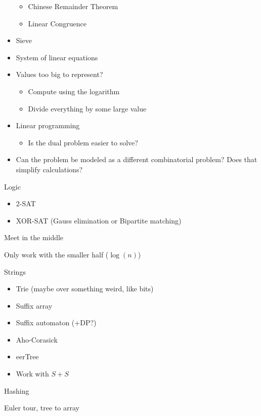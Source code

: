 \begin{myitemize}
\begin{itemize}
\begin{itemize}
              \item Chinese Remainder Theorem
              \item Linear Congruence
            \end{itemize}
          \item Sieve
          \item System of linear equations
          \item Values too big to represent?
            \begin{itemize}
              \item Compute using the logarithm
              \item Divide everything by some large value
            \end{itemize}
          \item Linear programming
            \begin{itemize}
              \item Is the dual problem easier to solve?
            \end{itemize}
          \item Can the problem be modeled as a different combinatorial problem? Does that simplify calculations?
        \end{itemize}
      \item Logic
        \begin{itemize}
          \item 2-SAT
          \item XOR-SAT (Gauss elimination or Bipartite matching)
        \end{itemize}
      \item Meet in the middle
      \item Only work with the smaller half ($\log(n)$)
      \item Strings
        \begin{itemize}
          \item Trie (maybe over something weird, like bits)
          \item Suffix array
          \item Suffix automaton (+DP?)
          \item Aho-Corasick
          \item eerTree
          \item Work with $S+S$
        \end{itemize}
      \item Hashing
      \item Euler tour, tree to array

\end{myitemize}
